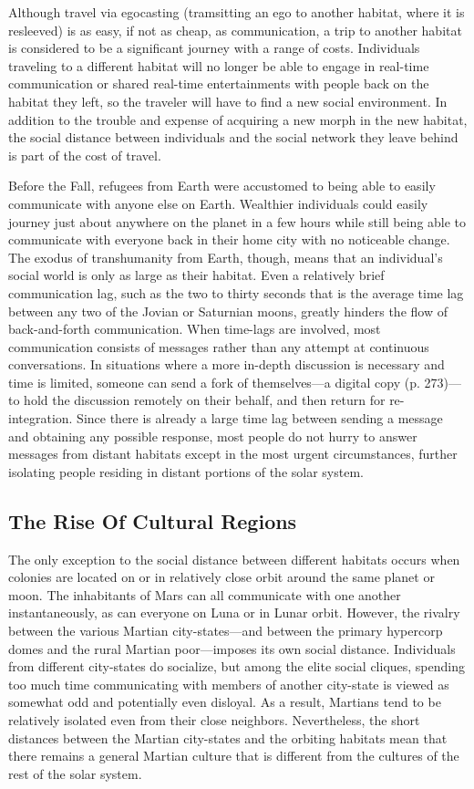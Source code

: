 Although travel via egocasting (tramsitting an ego 
to another habitat, where it is resleeved) is as easy, 
if not as cheap, as communication, a trip to another 
habitat is considered to be a significant journey with 
a range of costs. Individuals traveling to a different 
habitat will no longer be able to engage in real-time 
communication or shared real-time entertainments 
with people back on the habitat they left, so the 
traveler will have to find a new social environment. 
In addition to the trouble and expense of acquiring 
a new morph in the new habitat, the social distance 
between individuals and the social network they leave 
behind is part of the cost of travel.

Before the Fall, refugees from Earth were accustomed to being able to easily communicate with 
anyone else on Earth. Wealthier individuals could 
easily journey just about anywhere on the planet in a 
few hours while still being able to communicate with 
everyone back in their home city with no noticeable 
change. The exodus of transhumanity from Earth, 
though, means that an individual's social world is 
only as large as their habitat. Even a relatively brief 
communication lag, such as the two to thirty seconds 
that is the average time lag between any two of the 
Jovian or Saturnian moons, greatly hinders the flow of 
back-and-forth communication. When time-lags are 
involved, most communication consists of messages 
rather than any attempt at continuous conversations. 
In situations where a more in-depth discussion is necessary and time is limited, someone can send a fork 
of themselves—a digital copy (p. 273)—to hold the 
discussion remotely on their behalf, and then return 
for re-integration. Since there is already a large time 
lag between sending a message and obtaining any possible response, most people do not hurry to answer 
messages from distant habitats except in the most 
urgent circumstances, further isolating people residing 
in distant portions of the solar system.

\subsection{The Rise Of Cultural Regions}

The only exception to the social distance between different habitats occurs when colonies are located on 
or in relatively close orbit around the same planet or 
moon. The inhabitants of Mars can all communicate 
with one another instantaneously, as can everyone 
on Luna or in Lunar orbit. However, the rivalry between the various Martian city-states—and between 
the primary hypercorp domes and the rural Martian 
poor—imposes its own social distance. Individuals 
from different city-states do socialize, but among the 
elite social cliques, spending too much time communicating with members of another city-state is viewed 
as somewhat odd and potentially even disloyal. As 
a result, Martians tend to be relatively isolated even 
from their close neighbors. Nevertheless, the short 
distances between the Martian city-states and the 
orbiting habitats mean that there remains a general 
Martian culture that is different from the cultures of 
the rest of the solar system.

